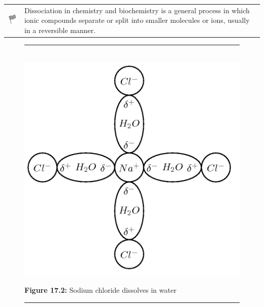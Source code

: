 \label{m38720*fhsst!!!underscore!!!id155}\begin{definition}
	  \begin{tabular*}{15 cm}{m{15 mm}m{}}
	\hspace*{-50pt}  \includegraphics[width=0.5in]{col11305.imgs/psflag2.png}   & \Definition{   \label{id2490327}\textbf{ Dissociation }} { \label{m38720*meaningfhsst!!!underscore!!!id155}
        Dissociation in chemistry and biochemistry is a general process in which ionic compounds separate or split into smaller molecules or ions, usually in a reversible manner.  
         } 
      \end{tabular*}
      \end{definition}
    \setcounter{subfigure}{0}
	\begin{figure}[H] %
    \begin{center}
    \rule[.1in]{\figurerulewidth}{.005in} \\
        \label{m38720*uid21!!!underscore!!!media}\label{m38720*uid21!!!underscore!!!printimage}\includegraphics{col11305.imgs/m38720_CG10C8_002.png} %
      \vspace{2pt}
    \vspace{\rubberspace}\par \begin{cnxcaption}
	  \small \textbf{Figure 17.2: }Sodium chloride dissolves in water
	\end{cnxcaption}
    \vspace{.1in}
    \rule[.1in]{\figurerulewidth}{.005in} \\
    \end{center}
 \end{figure}       
